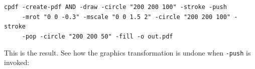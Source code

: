 \documentclass{book}
\begin{document}
\begin{framed}
 \noindent\small\verb?cpdf -create-pdf AND -draw -circle "200 200 100" -stroke -push?\\
 \noindent\small\verb?     -mrot "0 0 -0.3" -mscale "0 0 1.5 2" -circle "200 200 100" -stroke?\\
 \noindent\small\verb?     -pop -circle "200 200 50" -fill -o out.pdf?
\end{framed}

\noindent This is the result. See how the graphics transformation is undone when \texttt{-push} is invoked:

\bigskip
\ifdefined\HCode
{}
\else
{}
\fi
\bigskip
\end{document}

